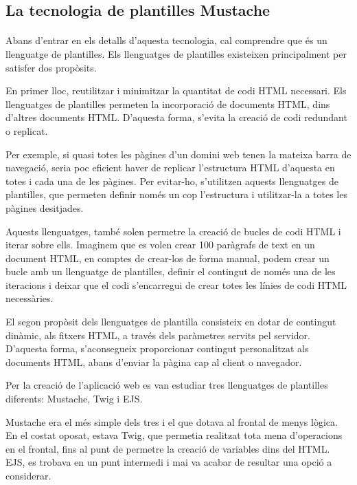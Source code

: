 \subsection{La tecnologia de plantilles Mustache}

    \paragraph{}
    Abans d'entrar en els detalls d'aquesta tecnologia, cal comprendre que és un llenguatge de plantilles. Els llenguatges de plantilles existeixen principalment per satisfer dos propòsits.

    En primer lloc, reutilitzar i minimitzar la quantitat de codi HTML necessari. Els llenguatges de plantilles permeten la incorporació de documents HTML, dins d'altres documents HTML. D'aquesta forma, s'evita la creació de codi redundant o replicat.

    Per exemple, si quasi totes les pàgines d'un domini web tenen la mateixa barra de navegació, seria poc eficient haver de replicar l'estructura HTML d'aquesta en totes i cada una de les pàgines. Per evitar-ho, s'utilitzen aquests llenguatges de plantilles, que permeten definir només un cop l'estructura i utilitzar-la a totes les pàgines desitjades.

    Aquests llenguatges, també solen permetre la creació de bucles de codi HTML i iterar sobre ells. Imaginem que es volen crear 100 paràgrafs de text en un document HTML, en comptes de crear-los de forma manual, podem crear un bucle amb un llenguatge de plantilles, definir el contingut de només una de les iteracions i deixar que el codi s'encarregui de crear totes les línies de codi HTML necessàries.

    El segon propòsit dels llenguatges de plantilla consisteix en dotar de contingut dinàmic, als fitxers HTML, a través dels paràmetres servits pel servidor. D’aquesta forma, s’aconsegueix proporcionar contingut personalitzat als documents HTML, abans d'enviar la pàgina cap al client o navegador.

    Per la creació de l'aplicació web es van estudiar tres llenguatges de plantilles diferents: Mustache, Twig i EJS.

    Mustache era el més simple dels tres i el que dotava al frontal de menys lògica. En el costat oposat, estava Twig, que permetia realitzat tota mena d'operacions en el frontal, fins al punt de permetre la creació de variables dins del HTML. EJS, es trobava en un punt intermedi i mai va acabar de resultar una opció a considerar.

